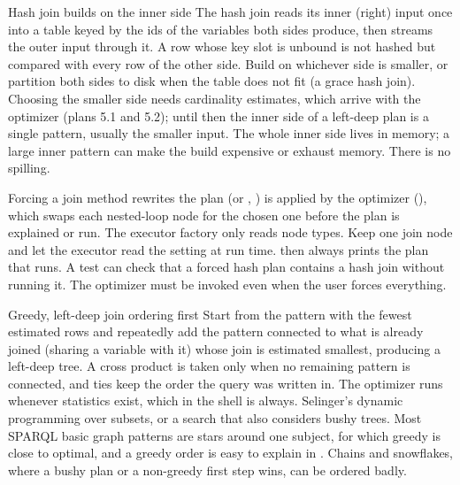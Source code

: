 \begin{decision}{Hash join builds on the inner side}
 The hash join reads its inner (right) input once into a table
keyed by the ids of the variables both sides produce, then streams the outer
input through it. A row whose key slot is unbound is not hashed but compared
with every row of the other side.
 Build on whichever side is smaller, or partition both
sides to disk when the table does not fit (a grace hash join).
 Choosing the smaller side needs cardinality estimates, which
arrive with the optimizer (plans 5.1 and 5.2); until then the inner side of a
left-deep plan is a single pattern, usually the smaller input.
 The whole inner side lives in memory; a large inner pattern can
make the build expensive or exhaust memory. There is no spilling.
\end{decision}

\begin{decision}{Forcing a join method rewrites the plan}
  (or , )
is applied by the optimizer (), which swaps
each nested-loop node for the chosen one before the plan is explained or run.
The executor factory only reads node types.
 Keep one join node and let the executor read the setting
at run time.
  then always prints the plan that
runs. A test can check that a forced hash plan contains a hash join without
running it.
 The optimizer must be invoked even when the user forces
everything.
\end{decision}

\begin{decision}{Greedy, left-deep join ordering first}
 Start from the pattern with the fewest estimated rows and
repeatedly add the pattern connected to what is already joined (sharing a
variable with it) whose join is estimated smallest, producing a left-deep
tree. A cross product is taken only when no remaining pattern is connected,
and ties keep the order the query was written in. The optimizer runs whenever
statistics exist, which in the shell is always.
 Selinger's dynamic programming over subsets, or a search
that also considers bushy trees.
 Most SPARQL basic graph patterns are stars around one subject, for
which greedy is close to optimal, and a greedy order is easy to explain in
.
 Chains and snowflakes, where a bushy plan or a non-greedy first
step wins, can be ordered badly.
\end{decision}

